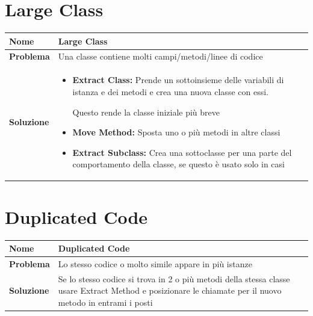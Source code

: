 \section{Large Class}
\begin{table}[h]
    \centering
    \renewcommand{\arraystretch}{1.2} %
    \begin{tabularx}{\textwidth}{l X}
        \toprule
        \textbf{Nome} & Large Class 
        \\
        \midrule
        \textbf{Problema} &
        Una classe contiene molti campi/metodi/linee di codice
        \\
        \midrule
        \textbf{Soluzione} & 
        \begin{itemize}
            \item \textbf{Extract Class:} Prende un sottoinsieme delle variabili di istanza e dei metodi e crea una nuova classe con essi.
            
            Questo rende la classe iniziale più breve
            \item \textbf{Move Method:} Sposta uno o più metodi in altre classi
            \item \textbf{Extract Subclass:} Crea una sottoclasse per una parte del comportamento della classe, se questo è usato solo in casi
        \end{itemize}
        \\ %
        \bottomrule
    \end{tabularx}
\end{table}

\section{Duplicated Code}
\begin{table}[h]
    \centering
    \renewcommand{\arraystretch}{1.2} %
    \begin{tabularx}{\textwidth}{l X}
        \toprule
        \textbf{Nome} & Duplicated Code \\
        \midrule
        \textbf{Problema} & Lo stesso codice o molto simile appare in più istanze \\
        \midrule
        \textbf{Soluzione} & 
        Se lo stesso codice si trova in 2 o più metodi della stessa classe usare Extract Method e posizionare le chiamate per il nuovo metodo in entrami i posti
        \\ %
        \bottomrule
    \end{tabularx}
\end{table}

